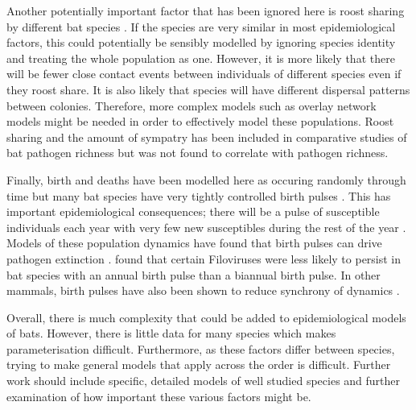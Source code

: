 Another potentially important factor that has been ignored here is roost sharing by different bat species \cite{maganga2014bat, lopez2014seroprevalence, serra2002european, pons2014insights, deThoisy2016bioecological}.
If the species are very similar in most epidemiological factors, this could potentially be sensibly modelled by ignoring species identity and treating the whole population as one.
However, it is more likely that there will be fewer close contact events between individuals of different species even if they roost share.
It is also likely that species will have different dispersal patterns between colonies.
Therefore, more complex models such as overlay network models might be needed in order to effectively model these populations.
Roost sharing and the amount of sympatry has been included in comparative studies of bat pathogen richness \cite{maganga2014bat} but was not found to correlate with pathogen richness.

Finally, birth and deaths have been modelled here as occuring randomly through time but many bat species have very tightly controlled birth pulses \cite{dietrich2015leptospira, george2011host, porter2001birth, greiner2011predictable}.
This has important epidemiological consequences; there will be a pulse of susceptible individuals each year with very few new susceptibles during the rest of the year \cite{dietrich2015leptospira}.
Models of these population dynamics have found that birth pulses can drive pathogen extinction \cite{peel2014effect}.
\textcite{hayman2015biannual} found that certain Filoviruses were less likely to persist in bat species with an annual birth pulse than a biannual birth pulse.
In other mammals, birth pulses have also been shown to reduce synchrony of dynamics \cite{duke2011strong}.

Overall, there is much complexity that could be added to epidemiological models of bats.
However, there is little data for many species which makes parameterisation difficult.
Furthermore, as these factors differ between species, trying to make general models that apply across the order is difficult.
Further work should include specific, detailed models of well studied species and further examination of how important these various factors might be.




